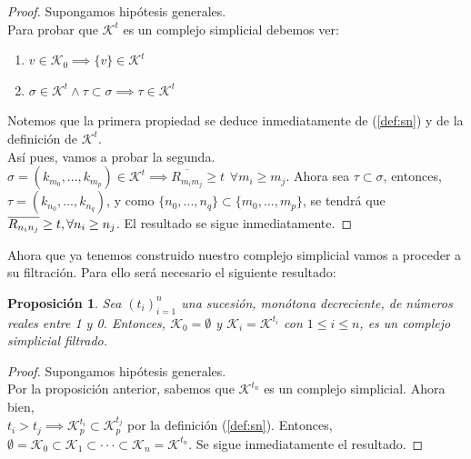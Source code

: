 \documentclass[12pt]{article}
\numberwithin{equation}{section}
\theoremstyle{definition}
\theoremstyle{remark}
\theoremstyle{plain}
\newtheorem{prop}{Proposición}
\begin{document}
		\newpage

		\begin{proof}
			Supongamos hipótesis generales. \\
			Para probar que $\mathcal{K}^{t}$ es un complejo simplicial debemos ver: 
			\begin{enumerate}
				\item $v \in \mathcal{K}_{0} \implies \{v\} \in \mathcal{K}^{t}$
				\item $ \sigma \in \mathcal{K}^{t} \land \tau \subset \sigma \implies \tau \in \mathcal{K}^{t}$	
			\end{enumerate}
			Notemos que la primera propiedad se deduce inmediatamente de (\ref{def:sn}) y de la definición 
			de $\mathcal{K}^{t}$. \\
			Así pues, vamos a probar la segunda.\\
			$\sigma=(k_{m_{0}},...,k_{m_{p}}) \in \mathcal{K}^{t} \implies \overline{R_{m_{i}m_{j}}}\geq t \hspace{5pt} 
			\forall m_{i} \geq m_{j}$. Ahora sea $\tau \subset \sigma$, entonces, \\
			$\tau = (k_{n_{0}},...,k_{n_{q}})$, y como $\{n_{0},...,n_{q}\} \subset \{m_{0},...,m_{p}\}$, se tendrá que $\overline{R_{n_{i}n_{j}}} \geq t, \\
			\forall n_{i} \geq n_{j}$. El resultado se sigue inmediatamente. 
		\end{proof}

		Ahora que ya tenemos construido nuestro complejo simplicial vamos a proceder a su filtración. Para ello será necesario
		el siguiente resultado:

		\begin{prop}
			Sea $(t_{i})_{i=1}^{n}$ una sucesión, monótona decreciente, de números reales entre 1 y 0. Entonces, 
			$\mathcal{K}_{0}=\emptyset$ y $\mathcal{K}_{i}=\mathcal{K}^{t_{i}}$ con $1\leq i \leq n$, es un complejo simplicial filtrado.   
		\end{prop}

		\begin{proof}
			Supongamos hipótesis generales.\\
			Por la proposición anterior, sabemos que $\mathcal{K}^{t_{n}}$ es un complejo simplicial. Ahora bien, \\
			$t_{i} > t_{j} \implies \mathcal{K}_{p}^{t_{i}} \subset \mathcal{K}_{p}^{t_{j}}$ por la definición (\ref{def:sn}). Entonces, 
			$\emptyset=\mathcal{K}_{0} \subset \mathcal{K}_{1} \subset \cdot \cdot \cdot \subset \mathcal{K}_{n}=\mathcal{K}^{t_{n}}$. Se sigue
			inmediatamente el resultado.
		\end{proof}
\end{document}
